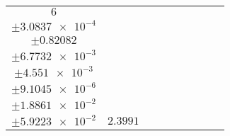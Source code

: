 \documentclass[8pt]{article}
\begin{document}
\begin{longtable}[l]{c c c c c c c c c}
$\num{6}$ & \begin{tabular}[c]{@{}c@{}}$\num{3.3358e-2}$ \\ $\pm\num{3.0837e-4}$\end{tabular} & \begin{tabular}[c]{@{}c@{}}$\num{1.7427}$ \\ $\pm\num{0.82082}$\end{tabular} & \begin{tabular}[c]{@{}c@{}}$\num{7.4917}$ \\ $\pm\num{6.7732e-3}$\end{tabular} & \begin{tabular}[c]{@{}c@{}}$\num{2.9642e+3}$ \\ $\pm\num{4.551e-3}$\end{tabular} & \begin{tabular}[c]{@{}c@{}}$\num{5.9301}$ \\ $\pm\num{9.1045e-6}$\end{tabular} & \begin{tabular}[c]{@{}c@{}}$\num{2.6247}$ \\ $\pm\num{1.8861e-2}$\end{tabular} & \begin{tabular}[c]{@{}c@{}}$\num{4.8994}$ \\ $\pm\num{5.9223e-2}$\end{tabular} & $\num{2.3991}$\\
\bottomrule
\end{longtable}
\end{document}
